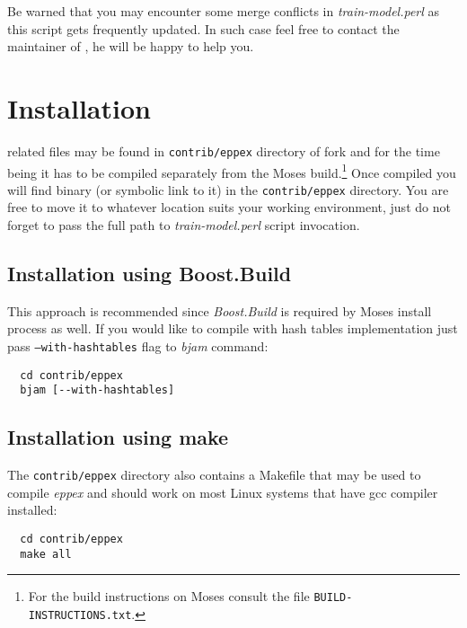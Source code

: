Be warned that you may encounter some merge conflicts in \emph{train-model.perl}
as this script gets frequently updated.
In such case feel free to contact the maintainer of \eppex{},
he will be happy to help you.

\section*{Installation}

\Eppex{} related files may be found in \texttt{contrib/eppex} directory of \eppex{} fork
and for the time being it has to be compiled separately from the Moses
build.\footnote{For the build instructions on Moses consult the file \texttt{BUILD-INSTRUCTIONS.txt}.}
Once compiled you will find \eppex{} binary (or symbolic link to it) in the
\texttt{contrib/eppex} directory. You are free to move it to whatever location
suits your working environment, just do not forget to pass the full path
to \emph{train-model.perl} script invocation.

\subsection*{Installation using Boost.Build}

This approach is recommended since \emph{Boost.Build}
is required by Moses install process as well.
If you would like to compile \eppex{} with hash tables implementation just pass \texttt{--with-hashtables} flag
to \emph{bjam} command:
\begin{verbatim}
  cd contrib/eppex
  bjam [--with-hashtables]
\end{verbatim}

\subsection*{Installation using make}
The \texttt{contrib/eppex} directory also contains a Makefile that may be used to compile
\emph{eppex} and should work on most Linux systems that have gcc compiler installed:
\begin{verbatim}
  cd contrib/eppex
  make all
\end{verbatim}
